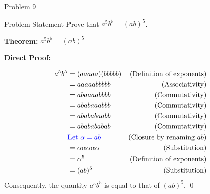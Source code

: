 \begin{problem}{Problem 9}
    \begin{statement}{Problem Statement}
        Prove that $a^{5}b^{5} = (ab)^{5}$.
    \end{statement}

    \begin{highlight}[Solution]
        \textbf{Theorem:} $a^{5}b^{5} = (ab)^{5}$ \vspace*{1em}

        \textbf{Direct Proof:} \vspace*{1em}

        \begin{align*}
            a^{5}b^{5} & = (aaaaa)(bbbbb) & \text{(Definition of exponents)} \\
            & = aaaaabbbbb & \text{(Associativity)} \\
            & = abaaaabbbb & \text{(Commutativity)} \\
            & = ababaaabbb & \text{(Commutativity)} \\
            & = abababaabb & \text{(Commutativity)} \\
            & = ababababab & \text{(Commutativity)} \\
            & \textcolor{blue}{\text{Let } \alpha = ab} & \text{(Closure by renaming $ab$)} \\
            & = \alpha \alpha \alpha \alpha \alpha & \text{(Substitution)} \\
            & = \alpha^{5} & \text{(Definition of exponents)} \\
            & = (ab)^{5} & \text{(Substitution)}
        \end{align*}
        Consequently, the quantity $a^{5}b^{5}$ is equal to that of $(ab)^{5}$. \qed
    \end{highlight}
\end{problem}

